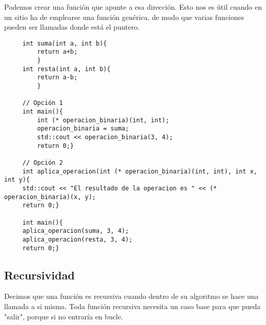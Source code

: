 \documentclass[a4paper]{article}
\begin{document}
	 Podemos crear una función que apunte a esa dirección. Esto nos es útil cuando en un sitio ha de emplearse una función genérica, de modo que varias funciones pueden ser llamadas donde está el puntero. 
	 
	 \begin{verbatim}
	 int suma(int a, int b){
		 return a+b;
		 }
	 int resta(int a, int b){
		 return a-b;
		 }
	
	 // Opción 1
	 int main(){
		 int (* operacion_binaria)(int, int);
		 operacion_binaria = suma;
		 std::cout << operacion_binaria(3, 4);
		 return 0;}
	 
	 // Opción 2
	 int aplica_operacion(int (* operacion_binaria)(int, int), int x, int y){
	 std::cout << "El resultado de la operacion es " << (* operacion_binaria)(x, y);
	 return 0;}
	 
	 int main(){
	 aplica_operacion(suma, 3, 4);
	 aplica_operacion(resta, 3, 4);
	 return 0;}
	 \end{verbatim}
	 
	 \subsection{Recursividad}
	 Decimos que una función es recursiva cuando dentro de su algoritmo se hace una llamada a si misma. Toda función recursiva necesita un caso base para que pueda "salir", porque si no entraría en bucle.
	 
\end{document}
